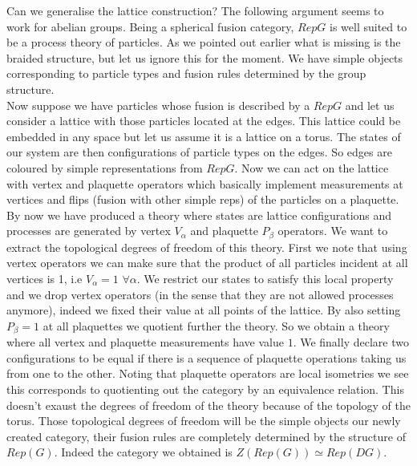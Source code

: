 \documentclass{article}
\newenvironment{remark}[1][Remark]{\begin{trivlist}
		\item[\hskip \labelsep {\bfseries #1}]}{\end{trivlist}}
\begin{document}
\begin{remark}
	Can we generalise the lattice construction?
	The following argument seems to work for abelian groups.
	Being a spherical fusion category, $RepG$ is well suited to be a process theory of particles. As we pointed out earlier what is missing is the braided structure, but let us ignore this for the moment. We have simple objects corresponding to particle types and fusion rules determined by the group structure.\\
	Now suppose we have particles whose fusion is described by a $RepG$ and let us consider a lattice with those particles located at the edges. This lattice could be embedded in any space but let us assume it is a lattice on a torus. The states of our system are then configurations of particle types on the edges. So edges are coloured by simple representations from $RepG$. Now we can act on the lattice with vertex and plaquette operators which basically implement measurements at vertices and flips (fusion with other simple reps) of the particles on a plaquette. By now we have produced a theory where states are lattice configurations and processes are generated by vertex $V_\alpha$ and plaquette $P_\beta$ operators. We want to extract the topological degrees of freedom of this theory. First we note that using vertex operators we can make sure that the product of all particles incident at all vertices is 1, i.e $V_\alpha=1$ $\forall \alpha$. We restrict our states to satisfy this local property and we drop vertex operators (in the sense that they are not allowed processes anymore), indeed we fixed their value at all points of the lattice. By also setting $P_\beta =1$ at all plaquettes we quotient further the theory. So we obtain a theory where all vertex and plaquette measurements have value $1$. We finally declare two configurations to be equal if there is a sequence of plaquette operations taking us from one to the other. Noting that plaquette operators are local isometries we see this corresponds to quotienting out the category by an equivalence relation. This doesn't exaust the degrees of freedom of the theory because of the topology of the torus. Those topological degrees of freedom will be the simple objects our newly created category, their fusion rules are completely determined by the structure of $Rep(G)$. Indeed the category we obtained is $Z(Rep(G)) \simeq Rep(DG)$.	
\end{remark}
\end{document}
